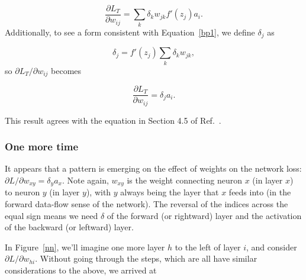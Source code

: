 \documentclass[12pt]{article}
\begin{document}
\begin{equation}
\frac{\partial L_T}{\partial w_{ij}} = \sum_k \delta_k w_{jk}f'(z_j)a_i.
\end{equation}
Additionally, to see a form consistent with Equation~\ref{bp1}, we define $\delta_j$ as

\begin{equation}
\delta_j =  f'(z_j) \sum_k \delta_k w_{jk},
\end{equation}
so $\partial L_T/\partial w_{ij}$ becomes

\begin{equation}
\frac{\partial L_T}{\partial w_{ij}} = \delta_j a_i.
\end{equation}

 

\noindent This result agrees with the equation in Section 4.5 of Ref.~\cite{swarthmore}.


\subsubsection{One more time}

It appears that a pattern is emerging on the effect of weights on the network loss:  ${\partial L}/{\partial w_{xy}}=\delta_y a_x$.  Note again, $w_{xy}$ is the weight connecting neuron $x$ (in layer $x$) to neuron $y$ (in layer $y$), with $y$ always being the layer that $x$ feeds into (in the forward data-flow sense of the network).  The reversal of the indices across the equal sign means we need $\delta$ of the forward (or rightward) layer and the activation of the backward (or leftward) layer.

In Figure~\ref{nn}, we'll imagine one more layer $h$ to the left of layer $i$, and consider $\partial L/\partial w_{hi}$. Without going through the steps, which are all have similar considerations to the above, we arrived at
\end{document}
